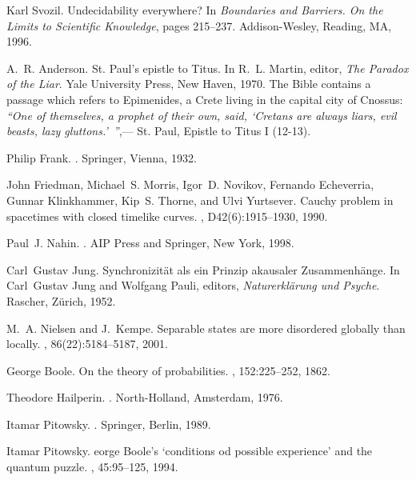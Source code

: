 \begin{thebibliography}{10}
Karl Svozil.
\newblock Undecidability everywhere?
\newblock In {\em Boundaries and Barriers. On the Limits to Scientific
  Knowledge}, pages 215--237. Addison-Wesley, Reading, MA, 1996.

A.~R. Anderson.
\newblock St. {P}aul's epistle to {T}itus.
\newblock In R.~L. Martin, editor, {\em The Paradox of the Liar}. Yale
  University Press, New Haven, 1970.
\newblock The Bible contains a passage which refers to Epimenides, a Crete
  living in the capital city of Cnossus: {\it ``One of themselves, a prophet of
  their own, said, `Cretans are always liars, evil beasts, lazy
  gluttons.'~''},--- St. Paul, Epistle to Titus I (12-13).

Philip Frank.
.
\newblock Springer, Vienna, 1932.

John Friedman, Michael~S. Morris, Igor~D. Novikov, Fernando Echeverria, Gunnar
  Klinkhammer, Kip~S. Thorne, and Ulvi Yurtsever.
\newblock Cauchy problem in spacetimes with closed timelike curves.
, D42(6):1915--1930, 1990.

Paul~J. Nahin.
.
\newblock AIP Press and Springer, New York, 1998.

Carl~Gustav Jung.
\newblock Synchronizit{\"{a}}t als ein {P}rinzip akausaler
  {Z}usammenh{\"{a}}nge.
\newblock In Carl~Gustav Jung and Wolfgang Pauli, editors, {\em
  Naturerkl{\"{a}}rung und Psyche}. Rascher, Z{\"{u}}rich, 1952.

M.~A. Nielsen and J.~Kempe.
\newblock Separable states are more disordered globally than locally.
, 86(22):5184--5187, 2001.

George Boole.
\newblock On the theory of probabilities.
,
  152:225--252, 1862.

Theodore Hailperin.
.
\newblock North-Holland, Amsterdam, 1976.

Itamar Pitowsky.
.
\newblock Springer, Berlin, 1989.

Itamar Pitowsky.
eorge {B}oole's `conditions od possible experience' and the
  quantum puzzle.
, 45:95--125, 1994.


\end{thebibliography}
